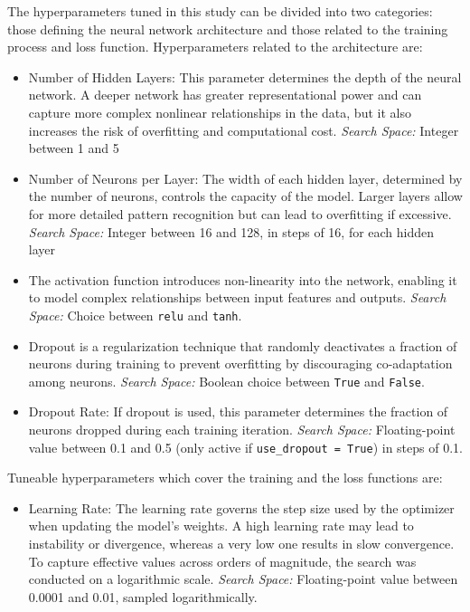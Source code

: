 {The hyperparameters tuned in this study can be divided into two categories: those defining the neural network architecture and those related to the training process and loss function. Hyperparameters related to the architecture are:
\begin{itemize}
	\item Number of Hidden Layers: This parameter determines the depth of the neural network. A deeper network has greater representational power and can capture more complex nonlinear relationships in the data, but it also increases the risk of overfitting and computational cost. \newline
	      \textit{Search Space:} Integer between 1 and 5
	\item Number of Neurons per Layer: The width of each hidden layer, determined by the number of neurons, controls the capacity of the model. Larger layers allow for more detailed pattern recognition but can lead to overfitting if excessive. \newline
	      \textit{Search Space:} Integer between 16 and 128, in steps of 16, for each hidden layer
	\item The activation function introduces non-linearity into the network, enabling it to model complex relationships between input features and outputs. \newline
	      \textit{Search Space:} Choice between \texttt{relu} and \texttt{tanh}.
	\item Dropout is a regularization technique that randomly deactivates a fraction of neurons during training to prevent overfitting by discouraging co-adaptation among neurons. \newline
	      \textit{Search Space:} Boolean choice between \texttt{True} and \texttt{False}.
	\item Dropout Rate: If dropout is used, this parameter determines the fraction of neurons dropped during each training iteration. \newline
	      \textit{Search Space:} Floating-point value between 0.1 and 0.5 (only active if \texttt{use\_dropout = True}) in steps of 0.1.

\end{itemize}

Tuneable hyperparameters which cover the training and the loss functions are:
\begin{itemize}
	\item Learning Rate: The learning rate governs the step size used by the optimizer when updating the model’s weights. A high learning rate may lead to instability or divergence, whereas a very low one results in slow convergence. To capture effective values across orders of magnitude, the search was conducted on a logarithmic scale. \newline
	      \textit{Search Space:} Floating-point value between 0.0001 and 0.01, sampled logarithmically.


\end{itemize}}
